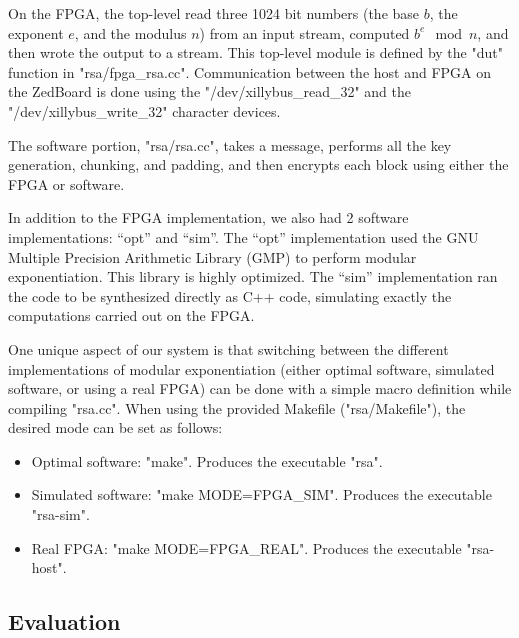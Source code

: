 On the FPGA, the top-level read three 1024 bit numbers (the base $b$, the exponent $e$, and the modulus $n$) from
an input stream, computed $b^e \mod n$, and then wrote the output to a stream.
This top-level module is defined by the "dut" function in "rsa/fpga_rsa.cc".
Communication between the host and FPGA on the ZedBoard is done using the "/dev/xillybus_read_32" and the "/dev/xillybus_write_32"
character devices.

The software portion, "rsa/rsa.cc", takes a message, performs all the key generation, chunking, and padding, and then encrypts
each block using either the FPGA or software.

In addition to the FPGA implementation, we also had 2 software implementations: ``opt'' and ``sim''. The ``opt'' implementation
used the GNU Multiple Precision Arithmetic Library (GMP) to perform modular exponentiation. This library is highly 
optimized. The ``sim'' implementation ran the code to be synthesized directly as C++ code, simulating exactly the computations
carried out on the FPGA.

One unique aspect of our system is that switching between the different implementations of modular exponentiation (either optimal
software, simulated software, or using a real FPGA) can be done with a simple macro definition while compiling "rsa.cc".
When using the provided Makefile ("rsa/Makefile"), the desired mode can be set as follows:
\begin{itemize}
\item Optimal software: "make". Produces the executable "rsa".
\item Simulated software: "make MODE=FPGA_SIM". Produces the executable "rsa-sim".
\item Real FPGA: "make MODE=FPGA_REAL". Produces the executable "rsa-host".
\end{itemize}

\subsection{Evaluation}


